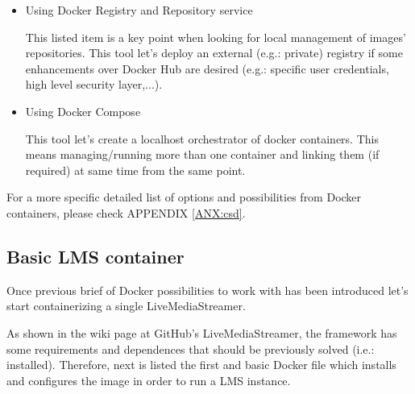 \begin{itemize}
\begin{itemize}
	\item Using Docker Registry and Repository service

	This	 listed item is a key point when looking for local management of images' repositories. This tool let's deploy an external (e.g.: private) registry if some enhancements over Docker Hub are desired (e.g.: specific user credentials, high level security layer,...).
	
	\item Using Docker Compose
	
	This tool let's create a localhost orchestrator of docker containers. This means managing/running more than one container and linking them (if required) at same time from the same point.
	
	\end{itemize}
\end{itemize}

For a more specific detailed list of options and possibilities from Docker containers, please check APPENDIX \ref{ANX:csd}.

\subsection{Basic LMS container}

Once previous brief of Docker possibilities to work with has been introduced let's start containerizing a single LiveMediaStreamer.

As shown in the wiki page at GitHub's LiveMediaStreamer, the framework has some requirements and dependences that should be previously solved (i.e.: installed). Therefore, next is listed the first and basic Docker file which installs and configures the image in order to run a LMS instance. 

